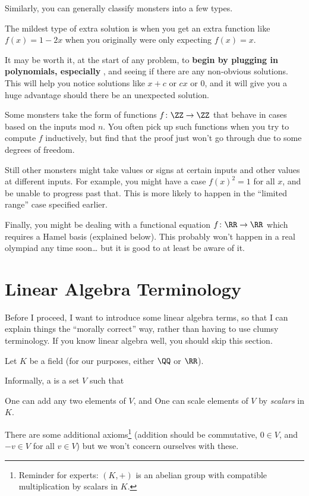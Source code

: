 \documentclass[11pt]{scrartcl}
\begin{document}
Similarly, you can generally classify monsters into a few types.
\begin{itemize}
  \ii The mildest type of extra solution is when you get an extra function like
  $f(x) = 1-2x$ when you originally were only expecting $f(x) = x$.

  It may be worth it, at the start of any problem, to
  \textbf{begin by plugging in polynomials,
    especially },
  and seeing if there are any non-obvious solutions.
  This will help you notice solutions like $x+c$ or $cx$ or $0$,
  and it will give you a huge advantage should there be an unexpected solution.

  \ii Some monsters take the form of functions $f \colon \ZZ \to \ZZ$ that behave
  in cases based on the inputs mod $n$.
  You often pick up such functions when you try to compute $f$ inductively,
  but find that the proof just won't go through
  due to some degrees of freedom.

  \ii Still other monsters might take values or signs at certain inputs
  and other values at different inputs.
  For example, you might have a case $f(x)^2 = 1$ for all $x$,
  and be unable to progress past that.
  This is more likely to happen in the ``limited range'' case specified earlier.

  \ii Finally, you might be dealing with a functional equation $f \colon \RR \to \RR$
  which requires a Hamel basis (explained below).
  This probably won't happen in a real olympiad any time soon\dots
  but it is good to at least be aware of it.
\end{itemize}

\section{Linear Algebra Terminology}
Before I proceed, I want to introduce some linear algebra terms,
so that I can explain things the ``morally correct'' way,
rather than having to use clumsy terminology.
If you know linear algebra well, you should skip this section.

Let $K$ be a field (for our purposes, either $\QQ$ or $\RR$).
\begin{definition}
  Informally, a  is a set $V$ such that
  \begin{itemize}
    \ii One can add any two elements of $V$, and
    \ii One can scale elements of $V$ by \emph{scalars} in $K$.
  \end{itemize}
  There are some additional axioms\footnote{Reminder for experts:
    $(K,+)$ is an abelian group with compatible multiplication by scalars in $K$.}
  (addition should be commutative, $0 \in V$, and $-v \in V$ for all $v \in V$)
  but we won't concern ourselves with these.
\end{definition}
\end{document}

